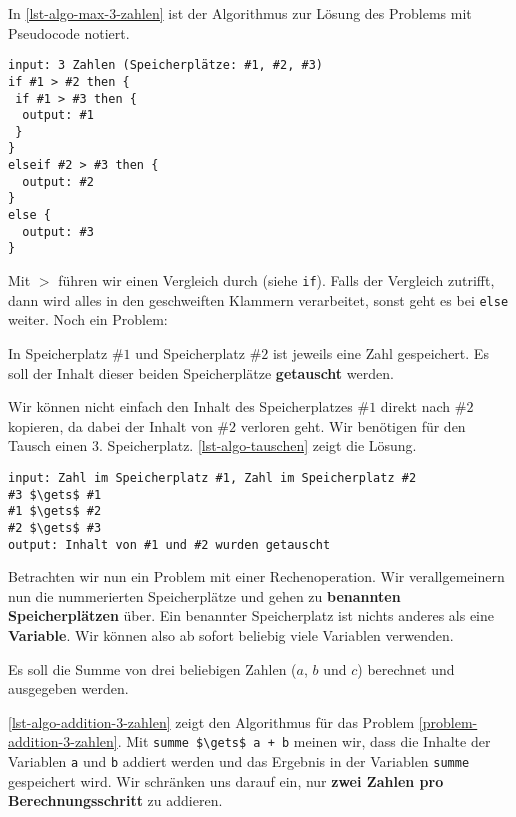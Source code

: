 In \autoref{lst-algo-max-3-zahlen} ist der Algorithmus zur Lösung des Problems mit Pseudocode notiert.

\begin{lstlisting}[language=pseudocode, caption={Algorithmus für das Problem \protect\autoref{problem-max-3-zahlen}. Speicherplatz \#1 wird mit \#1 abgekürzt etc.}, label={lst-algo-max-3-zahlen}]
input: 3 Zahlen (Speicherplätze: #1, #2, #3)
if #1 > #2 then {
 if #1 > #3 then {
  output: #1
 }
}
elseif #2 > #3 then {
  output: #2
}
else {
  output: #3
}
\end{lstlisting}

Mit $>$ führen wir einen Vergleich durch (siehe \texttt{if}). Falls der Vergleich zutrifft, dann wird alles in den geschweiften Klammern verarbeitet, sonst geht es bei \texttt{else} weiter. Noch ein Problem:

\begin{problem}[Tauschen]\label{problem-tauschen}
	In Speicherplatz $\#1$ und Speicherplatz $\#2$ ist jeweils eine Zahl gespeichert. Es soll der Inhalt dieser beiden Speicherplätze \textbf{getauscht} werden.
\end{problem}

Wir können nicht einfach den Inhalt des Speicherplatzes $\#1$ direkt nach $\#2$ kopieren, da dabei der Inhalt von $\#2$ verloren geht. Wir benötigen für den Tausch einen 3. Speicherplatz. \autoref{lst-algo-tauschen} zeigt die Lösung.

\begin{lstlisting}[language=pseudocode, caption={Der Algorithmus funktioniert für zwei beliebige Speicherinhalte.}, label={lst-algo-tauschen}]
input: Zahl im Speicherplatz #1, Zahl im Speicherplatz #2
#3 $\gets$ #1
#1 $\gets$ #2
#2 $\gets$ #3
output: Inhalt von #1 und #2 wurden getauscht
\end{lstlisting}

Betrachten wir nun ein Problem mit einer Rechenoperation. Wir verallgemeinern nun die nummerierten Speicherplätze und gehen zu \textbf{benannten Speicherplätzen} über. Ein benannter Speicherplatz ist nichts anderes als eine \textbf{Variable}. Wir können also ab sofort beliebig viele Variablen verwenden.

\begin{problem}\label{problem-addition-3-zahlen}
	Es soll die Summe von drei beliebigen Zahlen ($a$, $b$ und $c$) berechnet und ausgegeben werden.
\end{problem}

\autoref{lst-algo-addition-3-zahlen} zeigt den Algorithmus für das Problem \autoref{problem-addition-3-zahlen}. Mit \protect\lstinline[language=pseudocode]{summe $\gets$ a + b} meinen wir, dass die Inhalte der Variablen \protect\lstinline[language=pseudocode]{a} und \protect\lstinline[language=pseudocode]{b} addiert werden und das Ergebnis in der Variablen \protect\lstinline[language=pseudocode]{summe} gespeichert wird. Wir schränken uns darauf ein, nur \textbf{zwei Zahlen pro Berechnungsschritt} zu addieren.

